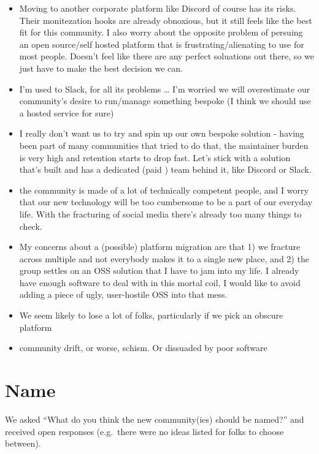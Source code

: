 \documentclass[
]{book}
\providecommand{\tightlist}{%
  \setlength{\itemsep}{0pt}\setlength{\parskip}{0pt}}
\begin{document}
\begin{itemize}
\tightlist
\item
  Moving to another corporate platform like Discord of course has its risks. Their monitezation hooks are already obnoxious, but it still feels like the best fit for this community. I also worry about the opposite problem of persuing an open source/self hosted platform that is frustrating/alienating to use for most people. Doesn't feel like there are any perfect soluations out there, so we just have to make the best decision we can.
\item
  I'm used to Slack, for all its problems \ldots{} I'm worried we will overestimate our community's desire to run/manage something bespoke (I think we should use a hosted service for sure)
\item
  I really don't want us to try and spin up our own bespoke solution - having been part of many communities that tried to do that, the maintainer burden is very high and retention starts to drop fast. Let's stick with a solution that's built and has a dedicated (paid ) team behind it, like Discord or Slack.
\item
  the community is made of a lot of technically competent people, and I worry that our new technology will be too cumbersome to be a part of our everyday life. With the fracturing of social media there's already too many things to check.
\item
  My concerns about a (possible) platform migration are that 1) we fracture across multiple and not everybody makes it to a single new place, and 2) the group settles on an OSS solution that I have to jam into my life. I already have enough software to deal with in this mortal coil, I would like to avoid adding a piece of ugly, user-hostile OSS into that mess.
\item
  We seem likely to lose a lot of folks, particularly if we pick an obscure platform
\item
  community drift, or worse, schism. Or dissuaded by poor software
\end{itemize}

\chapter{Name}\label{name}

We asked ``What do you think the new community(ies) should be named?'' and received open responses (e.g.~there were no ideas listed for folks to choose between).
\end{document}
